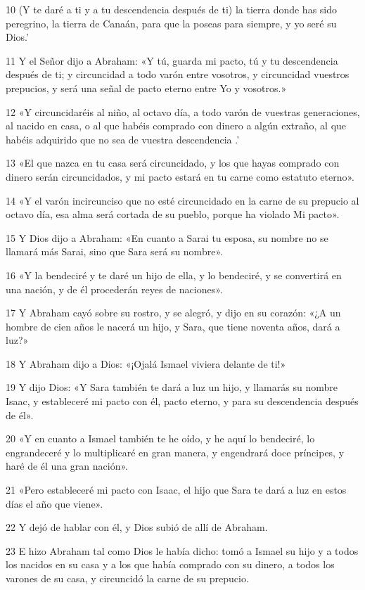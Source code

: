 \par 10 (Y te daré a ti y a tu descendencia después de ti) la tierra donde has sido peregrino, la tierra de Canaán, para que la poseas para siempre, y yo seré su Dios.'
\par 11 Y el Señor dijo a Abraham: «Y tú, guarda mi pacto, tú y tu descendencia después de ti; y circuncidad a todo varón entre vosotros, y circuncidad vuestros prepucios, y será una señal de pacto eterno entre Yo y vosotros.»
\par 12 «Y circuncidaréis al niño, al octavo día, a todo varón de vuestras generaciones, al nacido en casa, o al que habéis comprado con dinero a algún extraño, al que habéis adquirido que no sea de vuestra descendencia .'
\par 13 «El que nazca en tu casa será circuncidado, y los que hayas comprado con dinero serán circuncidados, y mi pacto estará en tu carne como estatuto eterno».
\par 14 «Y el varón incircunciso que no esté circuncidado en la carne de su prepucio al octavo día, esa alma será cortada de su pueblo, porque ha violado Mi pacto».
\par 15 Y Dios dijo a Abraham: «En cuanto a Sarai tu esposa, su nombre no se llamará más Sarai, sino que Sara será su nombre».
\par 16 «Y la bendeciré y te daré un hijo de ella, y lo bendeciré, y se convertirá en una nación, y de él procederán reyes de naciones».
\par 17 Y Abraham cayó sobre su rostro, y se alegró, y dijo en su corazón: «¿A un hombre de cien años le nacerá un hijo, y Sara, que tiene noventa años, dará a luz?»
\par 18 Y Abraham dijo a Dios: «¡Ojalá Ismael viviera delante de ti!»
\par 19 Y dijo Dios: «Y Sara también te dará a luz un hijo, y llamarás su nombre Isaac, y estableceré mi pacto con él, pacto eterno, y para su descendencia después de él».
\par 20 «Y en cuanto a Ismael también te he oído, y he aquí lo bendeciré, lo engrandeceré y lo multiplicaré en gran manera, y engendrará doce príncipes, y haré de él una gran nación».
\par 21 «Pero estableceré mi pacto con Isaac, el hijo que Sara te dará a luz en estos días el año que viene».
\par 22 Y dejó de hablar con él, y Dios subió de allí de Abraham.
\par 23 E hizo Abraham tal como Dios le había dicho: tomó a Ismael su hijo y a todos los nacidos en su casa y a los que había comprado con su dinero, a todos los varones de su casa, y circuncidó la carne de su prepucio.
